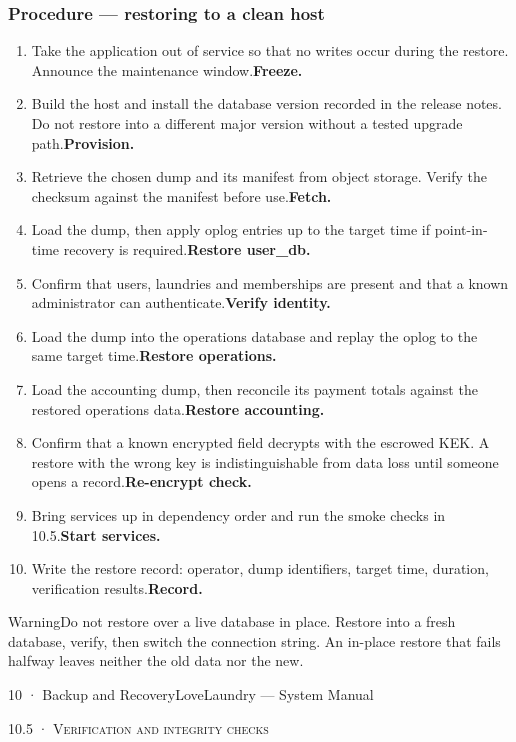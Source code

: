 \documentclass[11pt,a4paper,oneside]{book}
\begin{document}
\subsubsection*{Procedure — restoring to a clean host}
\begin{enumerate}
\item Take the application out of service so that no writes occur during the restore. Announce the maintenance window.\textbf{Freeze.}
\item Build the host and install the database version recorded in the release notes. Do not restore into a different major version without a tested upgrade path.\textbf{Provision.}
\item Retrieve the chosen dump and its manifest from object storage. Verify the checksum against the manifest before use.\textbf{Fetch.}
\item Load the dump, then apply oplog entries up to the target time if point-in-time recovery is required.\textbf{Restore user\_db.}
\item Confirm that users, laundries and memberships are present and that a known administrator can authenticate.\textbf{Verify identity.}
\item Load the dump into the operations database and replay the oplog to the same target time.\textbf{Restore operations.}
\item Load the accounting dump, then reconcile its payment totals against the restored operations data.\textbf{Restore accounting.}
\item Confirm that a known encrypted field decrypts with the escrowed KEK. A restore with the wrong key is indistinguishable from data loss until someone opens a record.\textbf{Re-encrypt check.}
\item Bring services up in dependency order and run the smoke checks in 10.5.\textbf{Start services.}
\item Write the restore record: operator, dump identifiers, target time, duration, verification results.\textbf{Record.}
\end{enumerate}
\begin{notebox}WarningDo not restore over a live database in place. Restore into a fresh database, verify, then switch the connection string. An in-place restore that fails halfway leaves neither the old data nor the new.\end{notebox}
10 · Backup and RecoveryLoveLaundry — System Manual

\textsc{\small\color{crimson}10.5 · Verification and integrity checks}\par\medskip
\end{document}
